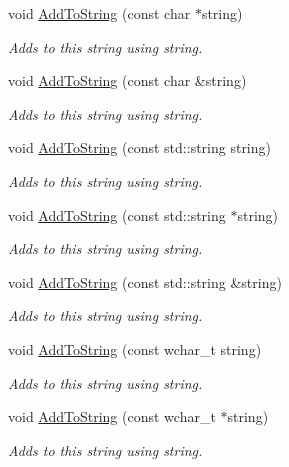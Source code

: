 \begin{DoxyCompactItemize}
void \hyperlink{class_triton_1_1_util_1_1_exe_string_a724c4047395919e0720b0dfb0239d3b1}{Add\+To\+String} (const char $\ast$string)
\begin{DoxyCompactList}\small\item\em Adds to this string using string. \end{DoxyCompactList}\item 
void \hyperlink{class_triton_1_1_util_1_1_exe_string_ae96cfe80e8e5f6d8f038b59ab10f33b9}{Add\+To\+String} (const char \&string)
\begin{DoxyCompactList}\small\item\em Adds to this string using string. \end{DoxyCompactList}\item 
void \hyperlink{class_triton_1_1_util_1_1_exe_string_aac5a97d888e222cd201c8fb821a14fd5}{Add\+To\+String} (const std\+::string string)
\begin{DoxyCompactList}\small\item\em Adds to this string using string. \end{DoxyCompactList}\item 
void \hyperlink{class_triton_1_1_util_1_1_exe_string_a942a69d1ff1a0e7c644c57c2ef87aaa9}{Add\+To\+String} (const std\+::string $\ast$string)
\begin{DoxyCompactList}\small\item\em Adds to this string using string. \end{DoxyCompactList}\item 
void \hyperlink{class_triton_1_1_util_1_1_exe_string_ae39fe2f5d6584a9421a9ba3a49945928}{Add\+To\+String} (const std\+::string \&string)
\begin{DoxyCompactList}\small\item\em Adds to this string using string. \end{DoxyCompactList}\item 
void \hyperlink{class_triton_1_1_util_1_1_exe_string_ad4be8d6e40ca7491f041c81c81735ffd}{Add\+To\+String} (const wchar\+\_\+t string)
\begin{DoxyCompactList}\small\item\em Adds to this string using string. \end{DoxyCompactList}\item 
void \hyperlink{class_triton_1_1_util_1_1_exe_string_ad8be7ca63a5f279b70b8b09adf17566e}{Add\+To\+String} (const wchar\+\_\+t $\ast$string)
\begin{DoxyCompactList}\small\item\em Adds to this string using string. \end{DoxyCompactList}\item 

\end{DoxyCompactItemize}

